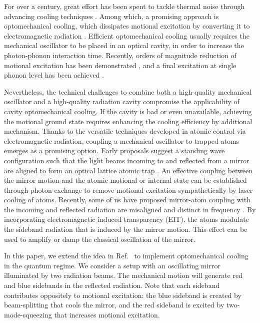 \documentclass[aps, pra, reprint, amsmath, amssymb, groupedaddress, acknowledgments]{revtex4-1}
\begin{document}
For over a century, great effort has been spent to tackle thermal noise through advancing cooling techniques \cite{book:cool}.  Among which, a promising approach is optomechanical cooling, which dissipates motional excitation by converting it to electromagnetic radiation \cite{WilsonRae:2007jp, Marquardt:2007dn,2014RvMP...86.1391A}.  
Efficient optomechanical cooling usually requires the mechanical oscillator to be placed in an optical cavity, in order to increase the photon-phonon interaction time.  Recently, orders of magnitude reduction of motional excitation has been demonstrated \cite{2011PhRvA..83f3835R,  2015PhRvL.114d3601S}, and a final excitation at single phonon level has been achieved \cite{Teufel:2011jg, Chan:2011dy}.

Nevertheless, the technical challenges to combine both a high-quality mechanical oscillator and a high-quality radiation cavity compromise the applicability of cavity optomechanical cooling.  If the cavity is bad or even unavailable, achieving the motional ground state requires enhancing the cooling efficiency by additional mechanism.  Thanks to the versatile techniques developed in atomic control via electromagnetic radiation, coupling a mechanical oscillator to trapped atoms emerges as a promising option.  Early proposals suggest a standing wave configuration such that the light beams incoming to and reflected from a mirror are aligned to form an optical lattice atomic trap \cite{2010PhRvA..82b1803H, 2011PhRvL.107v3001C, 2013PhRvA..87b3816V, 2015NJPh...17d3044V, Vochezer:2018cq}.  An effective coupling between the mirror motion and the atomic motional or internal state can be established through photon exchange to remove motional excitation sympathetically by laser cooling of atoms.  Recently, some of us have proposed mirror-atom coupling with the incoming and reflected radiation are misaligned and distinct in frequency \cite{2016PhRvA..93b3816S}.  By incorporating electromagnetic induced transparency (EIT), the atoms modulate the sideband radiation that is induced by the mirror motion.  This effect can be used to amplify or damp the classical oscillation of the mirror.


In this paper, we extend the idea in Ref.~\cite{2016PhRvA..93b3816S} to implement optomechanical cooling in the quantum regime.  We consider a setup with an oscillating mirror illuminated by two radiation beams.  
The mechanical motion will generate red and blue sidebands in the reflected radiation.  Note that each sideband contributes oppositely to motional excitation: the blue sideband is created by beam-splitting that cools the mirror, and the red sideband is excited by two-mode-squeezing that increases motional excitation.
\end{document}
